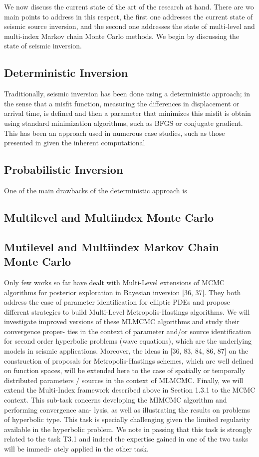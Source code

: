 
\hspace*{0.3cm}

We now discuss the current state of the art of the research at hand. There are wo main points to address in this respect, the first one addresses the current state of seismic source inversion, and the second one addresses the state of  multi-level and multi-index Markov chain Monte Carlo methods. We begin by discussing the state of seismic inversion.

 
 \subsection{Deterministic Inversion}
 Traditionally, seismic inversion has been done using a deterministic approach; in the sense that a misfit function, measuring the differences in displacement or arrival time, is defined and then a parameter that minimizes this misfit is obtain using standard minimization algorithms, such as BFGS or conjugate gradient. This has been an approach used in numerous case studies, such as those presented in 
 \cite{epanomeritakis2008newton,krebs2009fast,hormander1985analysis} given the inherent computational
 \subsection{Probabilistic Inversion}
 One of the main drawbacks of the deterministic approach is 

 \subsection{Multilevel and Multiindex Monte Carlo}
\subsection{Mutilevel and Multiindex Markov Chain Monte Carlo}
Only few works so far have dealt with Multi-Level extensions of MCMC algorithms for posterior
exploration in Bayesian inversion [36, 37]. They both address the case of parameter identification for
elliptic PDEs and propose different strategies to build Multi-Level Metropolis-Hastings algorithms. We
will investigate improved versions of these MLMCMC algorithms and study their convergence proper-
ties in the context of parameter and/or source identification for second order hyperbolic problems (wave
equations), which are the underlying models in seismic applications. Moreover, the ideas in [36, 83,
84, 86, 87] on the construction of proposals for Metropolis-Hastings schemes, which are well defined
on function spaces, will be extended here to the case of spatially or temporally distributed parameters /
sources in the context of MLMCMC.
Finally, we will extend the Multi-Index framework described above in Section 1.3.1 to the MCMC
context. This sub-task concerns developing the MIMCMC algorithm and performing convergence ana-
lysis, as well as illustrating the results on problems of hyperbolic type. This task is specially challenging
given the limited regularity available in the hyperbolic problem. We note in passing that this task is
strongly related to the task T3.1 and indeed the expertise gained in one of the two tasks will be immedi-
ately applied in the other task.